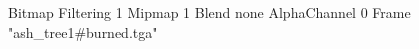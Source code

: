 {Bitmap
	{Filtering 1}
	{Mipmap 1}
	{Blend none}
	{AlphaChannel 0}
	{Frame "ash_tree1#burned.tga"}
}
